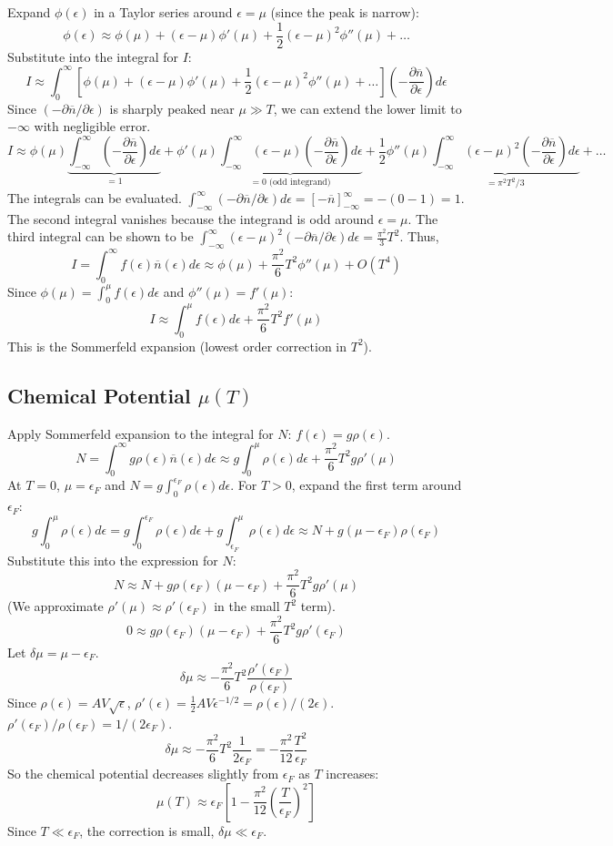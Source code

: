 \documentclass[11pt]{article}
\newcommand{\pderiv}[2]{\frac{\partial #1}{\partial #2}}
\newcommand{\eps}{\epsilon}
\newcommand{\nbar}{\overline{n}} %
\newcommand{\ef}{\epsilon_F} %
\begin{document}
Expand $\phi(\eps)$ in a Taylor series around $\eps=\mu$ (since the peak is narrow):
\[ \phi(\eps) \approx \phi(\mu) + (\eps-\mu) \phi'(\mu) + \frac{1}{2}(\eps-\mu)^2 \phi''(\mu) + \dots \]
Substitute into the integral for $I$:
\[ I \approx \int_0^\infty [ \phi(\mu) + (\eps-\mu)\phi'(\mu) + \frac{1}{2}(\eps-\mu)^2 \phi''(\mu) + \dots ] \left( -\pderiv{\nbar}{\eps} \right) d\eps \]
Since $(-\partial \nbar / \partial \eps)$ is sharply peaked near $\mu \gg T$, we can extend the lower limit to $-\infty$ with negligible error.
\[ I \approx \phi(\mu) \underbrace{\int_{-\infty}^\infty \left(-\pderiv{\nbar}{\eps}\right) d\eps}_{=1} + \phi'(\mu) \underbrace{\int_{-\infty}^\infty (\eps-\mu) \left(-\pderiv{\nbar}{\eps}\right) d\eps}_{=0 \text{ (odd integrand)}} + \frac{1}{2}\phi''(\mu) \underbrace{\int_{-\infty}^\infty (\eps-\mu)^2 \left(-\pderiv{\nbar}{\eps}\right) d\eps}_{=\pi^2 T^2 / 3} + \dots \]
The integrals can be evaluated. $\int_{-\infty}^\infty (-\partial \nbar / \partial \eps) d\eps = [-\nbar]_{-\infty}^\infty = -(0-1)=1$.
The second integral vanishes because the integrand is odd around $\eps=\mu$.
The third integral can be shown to be $\int_{-\infty}^\infty (\eps-\mu)^2 (-\partial \nbar / \partial \eps) d\eps = \frac{\pi^2}{3} T^2$.
Thus,
\[ I = \int_0^\infty f(\eps) \nbar(\eps) d\eps \approx \phi(\mu) + \frac{\pi^2}{6} T^2 \phi''(\mu) + O(T^4) \]
Since $\phi(\mu) = \int_0^\mu f(\eps) d\eps$ and $\phi''(\mu) = f'(\mu)$:
\[ I \approx \int_0^\mu f(\eps) d\eps + \frac{\pi^2}{6} T^2 f'(\mu) \]
This is the Sommerfeld expansion (lowest order correction in $T^2$).

\subsection*{Chemical Potential $\mu(T)$}
Apply Sommerfeld expansion to the integral for $N$: $f(\eps) = g\rho(\eps)$.
\[ N = \int_0^\infty g\rho(\eps) \nbar(\eps) d\eps \approx g \int_0^\mu \rho(\eps) d\eps + \frac{\pi^2}{6} T^2 g \rho'(\mu) \]
At $T=0$, $\mu=\ef$ and $N = g \int_0^{\ef} \rho(\eps) d\eps$.
For $T>0$, expand the first term around $\ef$:
\[ g \int_0^\mu \rho(\eps) d\eps = g \int_0^{\ef} \rho(\eps) d\eps + g \int_{\ef}^{\mu} \rho(\eps) d\eps \approx N + g (\mu - \ef) \rho(\ef) \]
Substitute this into the expression for $N$:
\[ N \approx N + g \rho(\ef) (\mu - \ef) + \frac{\pi^2}{6} T^2 g \rho'(\mu) \]
(We approximate $\rho'(\mu) \approx \rho'(\ef)$ in the small $T^2$ term).
\[ 0 \approx g \rho(\ef) (\mu - \ef) + \frac{\pi^2}{6} T^2 g \rho'(\ef) \]
Let $\delta\mu = \mu - \ef$.
\[ \delta\mu \approx -\frac{\pi^2}{6} T^2 \frac{\rho'(\ef)}{\rho(\ef)} \]
Since $\rho(\eps) = A V \sqrt{\eps}$, $\rho'(\eps) = \frac{1}{2} A V \eps^{-1/2} = \rho(\eps)/(2\eps)$.
$\rho'(\ef)/\rho(\ef) = 1/(2\ef)$.
\[ \delta\mu \approx -\frac{\pi^2}{6} T^2 \frac{1}{2\ef} = -\frac{\pi^2}{12} \frac{T^2}{\ef} \]
So the chemical potential decreases slightly from $\ef$ as $T$ increases:
\[ \mu(T) \approx \ef \left[ 1 - \frac{\pi^2}{12} \left(\frac{T}{\ef}\right)^2 \right] \]
Since $T \ll \ef$, the correction is small, $\delta\mu \ll \ef$.
\end{document}
